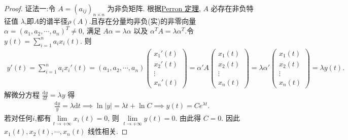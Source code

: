 \documentclass[../../main.tex]{subfiles}%
\begin{document}
\begin{proof}

{\color{blue}证法一:}令 \(A = (a_{ij})_{n \times n}\) 为非负矩阵. 根据\hyperref[theorem:Perron-Frobenius定理]{Perron 定理}, \(A\) 必存在非负特征值 \(\lambda\),即$A$的谱半径$\rho(A)$.且存在分量均非负(实)的非零向量 \(\alpha = (a_1, a_2, \cdots, a_n)^T \neq 0\), 满足 \(A\alpha = \lambda\alpha\) 以及 \(\alpha^T A = \lambda\alpha^T\).令 \(y(t) = \sum\limits_{i=1}^{n} a_i x_i(t)\). 则
\begin{align*}
y'(t) = \sum\limits_{i=1}^{n} a_i x_i'(t) = (a_1, a_2, \cdots, a_n) \begin{pmatrix} x_1'(t) \\ x_2'(t) \\ \vdots \\ x_n'(t) \end{pmatrix} = \alpha' A \begin{pmatrix} x_1(t) \\ x_2(t) \\ \vdots \\ x_n(t) \end{pmatrix} = \lambda \alpha' \begin{pmatrix} x_1(t) \\ x_2(t) \\ \vdots \\ x_n(t) \end{pmatrix} = \lambda y(t).
\end{align*}
解微分方程 \(\frac{\mathrm{d}y}{\mathrm{d}t} = \lambda y\) 得
\begin{align*}
\frac{\mathrm{d}y}{y} = \lambda \mathrm{d}t \implies \ln|y| = \lambda t + \ln C \implies y(t) = C e^{\lambda t}.
\end{align*}
若对任何$i$,都有\(\lim\limits_{t \to +\infty} x_i(t) = 0\), 则 \(\lim\limits_{t \to +\infty} y(t) = 0\). 由此得 \(C = 0\).
因此 \(x_1(t), x_2(t), \cdots, x_n(t)\) 线性相关.


\end{proof}
\end{document}

